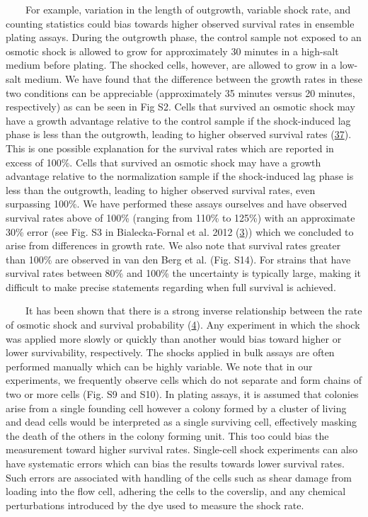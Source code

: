~~~~For
example,
variation
in the
length
of
outgrowth,
variable
shock
rate,
and
counting
statistics
could
bias
towards
higher
observed
survival
rates
in
ensemble
plating
assays.
During
the
outgrowth
phase,
the
control
sample
not
exposed
to an
osmotic
shock
is
allowed
to
grow
for
approximately
30
minutes
in a
high-salt
medium
before
plating.
The
shocked
cells,
however,
are
allowed
to
grow
in a
low-salt
medium.
We
have
found
that
the
difference
between
the
growth
rates
in
these
two
conditions
can be
appreciable
(approximately
35
minutes
versus
20
minutes,
respectively)
as can
be
seen
in Fig
S2.
Cells
that
survived
an
osmotic
shock
may
have a
growth
advantage
relative
to the
control
sample
if the
shock-induced
lag
phase
is
less
than
the
outgrowth,
leading
to
higher
observed
survival
rates
(\protect\hyperlink{ref-levina1999}{37}).
This
is one
possible
explanation
for
the
survival
rates
which
are
reported
in
excess
of
100\%.
Cells
that
survived
an
osmotic
shock
may
have a
growth
advantage
relative
to the
normalization
sample
if the
shock-induced
lag
phase
is
less
than
the
outgrowth,
leading
to
higher
observed
survival
rates,
even
surpassing
100\%.
We
have
performed
these
assays
ourselves
and
have
observed
survival
rates
above
of
100\%
(ranging
from
110\%
to
125\%)
with
an
approximate
30\%
error
(see
Fig.
S3 in
Bialecka-Fornal
et al.
2012
(\protect\hyperlink{ref-bialecka-fornal2012}{3}))
which
we
concluded
to
arise
from
differences
in
growth
rate.
We
also
note
that
survival
rates
greater
than
100\%
are
observed
in van
den
Berg
et al.
(Fig.
S14).
For
strains
that
have
survival
rates
between
80\%
and
100\%
the
uncertainty
is
typically
large,
making
it
difficult
to
make
precise
statements
regarding
when
full
survival
is
achieved.

~~~~It
has
been
shown
that
there
is a
strong
inverse
relationship
between
the
rate
of
osmotic
shock
and
survival
probability
(\protect\hyperlink{ref-bialecka-fornal2015}{4}).
Any
experiment
in
which
the
shock
was
applied
more
slowly
or
quickly
than
another
would
bias
toward
higher
or
lower
survivability,
respectively.
The
shocks
applied
in
bulk
assays
are
often
performed
manually
which
can be
highly
variable.
We
note
that
in our
experiments,
we
frequently
observe
cells
which
do not
separate
and
form
chains
of two
or
more
cells
(Fig.
S9 and
S10).
In
plating
assays,
it is
assumed
that
colonies
arise
from a
single
founding
cell
however
a
colony
formed
by a
cluster
of
living
and
dead
cells
would
be
interpreted
as a
single
surviving
cell,
effectively
masking
the
death
of the
others
in the
colony
forming
unit.
This
too
could
bias
the
measurement
toward
higher
survival
rates.
Single-cell
shock
experiments
can
also
have
systematic
errors
which
can
bias
the
results
towards
lower
survival
rates.
Such
errors
are
associated
with
handling
of the
cells
such
as
shear
damage
from
loading
into
the
flow
cell,
adhering
the
cells
to the
coverslip,
and
any
chemical
perturbations
introduced
by the
dye
used
to
measure
the
shock
rate.

